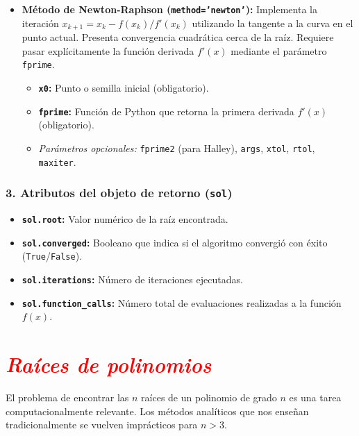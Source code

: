 \documentclass[12pt]{article}
\begin{document}
\begin{cajaflex}
\begin{itemize}
    \item \textbf{Método de Newton-Raphson (\texttt{method='newton'}):}
    Implementa la iteración $x_{k+1} = x_k - f(x_k)/f'(x_k)$ utilizando la 
    tangente a la curva en el punto actual.
    Presenta convergencia cuadrática cerca de la raíz. 
    Requiere pasar explícitamente la función derivada $f'(x)$ mediante 
    el parámetro \texttt{fprime}.
    \begin{itemize}
        \item \textbf{\texttt{x0}:} Punto o semilla inicial (obligatorio).
        \item \textbf{\texttt{fprime}:} Función de Python que retorna la primera derivada $f'(x)$ (obligatorio).
        \item \textit{Parámetros opcionales:} \texttt{fprime2} (para Halley), \texttt{args}, \texttt{xtol}, \texttt{rtol}, \texttt{maxiter}.
    \end{itemize}
\end{itemize}

\subsubsection*{\textcolor{teal!70!black}{3. Atributos del objeto de 
retorno (\texttt{sol})}}
\begin{itemize}
    \item \textbf{\texttt{sol.root}:} Valor numérico de la raíz encontrada.
    \item \textbf{\texttt{sol.converged}:} Booleano que indica si el algoritmo convergió con éxito (\texttt{True}/\texttt{False}).
    \item \textbf{\texttt{sol.iterations}:} Número de iteraciones ejecutadas.
    \item \textbf{\texttt{sol.function\_calls}:} Número total de evaluaciones realizadas a la función $f(x)$.
\end{itemize}

\end{cajaflex}

\section*{\textcolor{red}{\textit{Raíces de polinomios}}}

El problema de encontrar las $n$ raíces de un polinomio de grado $n$ es una tarea 
computacionalmente relevante. Los métodos analíticos que nos enseñan tradicionalmente 
se vuelven imprácticos para $n > 3$.
\end{document}
